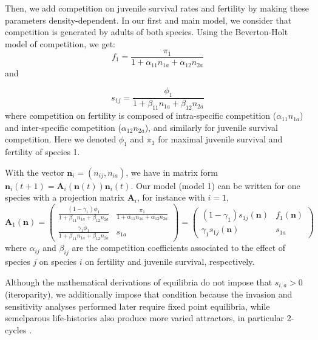 \documentclass{article}
\begin{document}
Then, we add competition on juvenile survival rates and fertility by making these parameters density-dependent. In our first and main model, we consider that competition is generated by adults of both species. Using the Beverton-Holt model of competition, we get:
\begin{equation}
    f_{1} = \frac{\pi_{1}}{1 + \alpha_{11} n_{1a} + \alpha_{12} n_{2a}}
\end{equation}
and

\begin{equation}
    s_{1j} = \frac{\phi_1}{1+\beta_{11}n_{1a}+\beta_{12}n_{2a}}
\end{equation}
where competition on fertility is composed of intra-specific competition ($\alpha_{11} n_{1a}$) and inter-specific competition ($\alpha_{12} n_{2a}$), and similarly for juvenile survival competition. Here we denoted $\phi_1$ and $\pi_1$ for maximal juvenile survival and fertility of species 1.

With the vector $\mathbf{n}_i = (n_{ij}, n_{ia})$, we have in matrix form $\mathbf{n}_i(t+1) = \mathbf{A}_i(\mathbf{n}(t))\mathbf{n}_i(t)$. Our model (model 1) can be written for one species with a projection matrix $\mathbf{A}_i$, for instance with $i=1$,
\begin{equation}
    \mathbf{A}_1(\mathbf{n}) = 
    \begin{pmatrix}
    \frac{(1-\gamma_1)\phi_1}{1+\beta_{11}n_{1a}+\beta_{12}n_{2a}} & \frac{\pi_{1}}{1 + \alpha_{11} n_{1a} + \alpha_{12} n_{2a} }\\
   \frac{\gamma_1\phi_1}{1+\beta_{11}n_{1a}+\beta_{12}n_{2a}}    & s_{1a}
    \end{pmatrix}
    =
    \begin{pmatrix}
    (1-\gamma_1)s_{1j}(\mathbf{n}) & f_1(\mathbf{n})\\
    \gamma_1 s_{1j}(\mathbf{n}) & s_{1a}
    \end{pmatrix}
\label{eq:combined_model}
\end{equation}
where $\alpha_{ij}$ and $\beta_{ij}$ are the competition coefficients associated to the effect of species $j$ on species $i$ on fertility and juvenile survival, respectively.

Although the mathematical derivations of equilibria do not impose that $s_{i,a}>0$ (iteroparity), we additionally impose that condition because the invasion and sensitivity analyses performed later require fixed point equilibria, while semelparous life-histories also produce more varied attractors, in particular 2-cycles \citep{cushing2007coexistence,cushing2012stable}.
\end{document}
